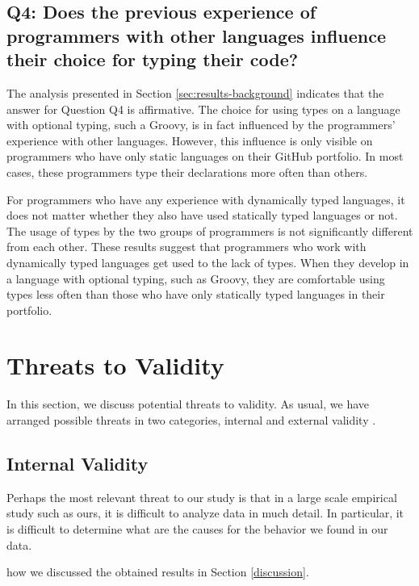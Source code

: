 \documentclass[preprint]{sigplanconf}
\begin{document}
\subsection*{Q4: Does the previous experience of programmers with other languages influence their choice for typing their code?\label{discussion-q4}}
The analysis presented in Section \ref{sec:results-background} indicates that the answer for Question Q4 is affirmative.
The choice for using types on a language with optional typing, such a Groovy, is in fact influenced by the programmers' experience with other languages.
However, this influence is only visible on programmers who have only static languages on their GitHub portfolio.
In most cases, these programmers type their declarations more often than others.

For programmers who have any experience with dynamically typed languages, it does not matter whether they also have used statically typed languages or not.
The usage of types by the two groups of programmers is not significantly different from each other.
These results suggest that programmers who work with dynamically typed languages get used to the lack of types.
When they develop in a language with optional typing, such as Groovy, they are comfortable using types less often than those who have only statically typed languages in their portfolio.








%
%
\section{Threats to Validity\label{threats}}
In this section, we discuss potential threats to validity. As usual, we have arranged possible threats in two categories, internal and external validity \cite{Wohlin2012}. 

\subsection*{Internal Validity}
Perhaps the most relevant threat to our study is that in a large scale empirical study such as ours, it is difficult to analyze data in much detail.
In particular, it is difficult to determine what are the causes for the behavior we found in our data.

how we discussed the obtained results in Section \ref{discussion}.
\end{document}
